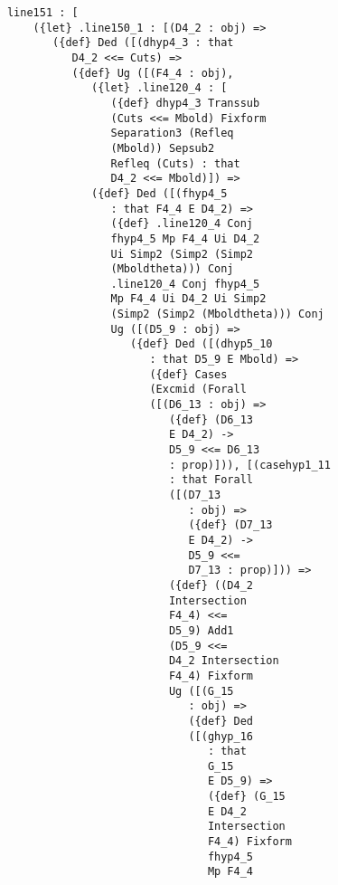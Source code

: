 \documentclass[12pt]{article}
\begin{document}
\begin{verbatim}
      line151 : [
          ({let} .line150_1 : [(D4_2 : obj) => 
             ({def} Ded ([(dhyp4_3 : that 
                D4_2 <<= Cuts) => 
                ({def} Ug ([(F4_4 : obj), 
                   ({let} .line120_4 : [
                      ({def} dhyp4_3 Transsub 
                      (Cuts <<= Mbold) Fixform 
                      Separation3 (Refleq 
                      (Mbold)) Sepsub2 
                      Refleq (Cuts) : that 
                      D4_2 <<= Mbold)]) => 
                   ({def} Ded ([(fhyp4_5 
                      : that F4_4 E D4_2) => 
                      ({def} .line120_4 Conj 
                      fhyp4_5 Mp F4_4 Ui D4_2 
                      Ui Simp2 (Simp2 (Simp2 
                      (Mboldtheta))) Conj 
                      .line120_4 Conj fhyp4_5 
                      Mp F4_4 Ui D4_2 Ui Simp2 
                      (Simp2 (Simp2 (Mboldtheta))) Conj 
                      Ug ([(D5_9 : obj) => 
                         ({def} Ded ([(dhyp5_10 
                            : that D5_9 E Mbold) => 
                            ({def} Cases 
                            (Excmid (Forall 
                            ([(D6_13 : obj) => 
                               ({def} (D6_13 
                               E D4_2) -> 
                               D5_9 <<= D6_13 
                               : prop)])), [(casehyp1_11 
                               : that Forall 
                               ([(D7_13 
                                  : obj) => 
                                  ({def} (D7_13 
                                  E D4_2) -> 
                                  D5_9 <<= 
                                  D7_13 : prop)])) => 
                               ({def} ((D4_2 
                               Intersection 
                               F4_4) <<= 
                               D5_9) Add1 
                               (D5_9 <<= 
                               D4_2 Intersection 
                               F4_4) Fixform 
                               Ug ([(G_15 
                                  : obj) => 
                                  ({def} Ded 
                                  ([(ghyp_16 
                                     : that 
                                     G_15 
                                     E D5_9) => 
                                     ({def} (G_15 
                                     E D4_2 
                                     Intersection 
                                     F4_4) Fixform 
                                     fhyp4_5 
                                     Mp F4_4 

\end{verbatim}
\end{document}
